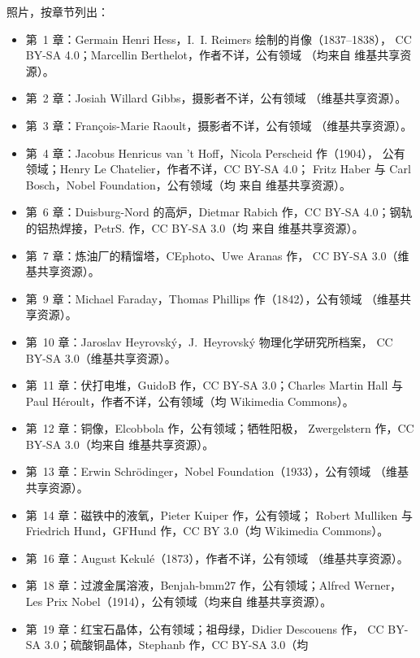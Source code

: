 \bigskip
\noindent 照片，按章节列出：
\begin{itemize}\small
  \item 第~1 章：Germain Henri Hess，I.~I. Reimers 绘制的肖像（1837--1838），
        CC BY-SA 4.0；Marcellin Berthelot，作者不详，公有领域
        （均来自 维基共享资源）。
  \item 第~2 章：Josiah Willard Gibbs，摄影者不详，公有领域
        （维基共享资源）。
  \item 第~3 章：François-Marie Raoult，摄影者不详，公有领域
        （维基共享资源）。
  \item 第~4 章：Jacobus Henricus van 't Hoff，Nicola Perscheid 作（1904），
        公有领域；Henry Le Chatelier，作者不详，CC BY-SA 4.0；
        Fritz Haber 与 Carl Bosch，Nobel Foundation，公有领域（均
        来自 维基共享资源）。
  \item 第~6 章：Duisburg-Nord 的高炉，Dietmar Rabich 作，CC BY-SA
        4.0；钢轨的铝热焊接，PetrS. 作，CC BY-SA 3.0（均
        来自 维基共享资源）。
  \item 第~7 章：炼油厂的精馏塔，CEphoto、Uwe Aranas 作，
        CC BY-SA 3.0（维基共享资源）。
  \item 第~9 章：Michael Faraday，Thomas Phillips 作（1842），公有领域
        （维基共享资源）。
  \item 第~10 章：Jaroslav Heyrovsk\'y，J.~Heyrovsk\'y 物理化学研究所档案，
        CC BY-SA 3.0（维基共享资源）。
  \item 第~11 章：伏打电堆，GuidoB 作，CC BY-SA 3.0；Charles Martin Hall
        与 Paul H\'eroult，作者不详，公有领域（均 Wikimedia
        Commons）。
  \item 第~12 章：铜像，Elcobbola 作，公有领域；牺牲阳极，
        Zwergelstern 作，CC BY-SA 3.0（均来自 维基共享资源）。
  \item 第~13 章：Erwin Schr\"odinger，Nobel Foundation（1933），公有领域
        （维基共享资源）。
  \item 第~14 章：磁铁中的液氧，Pieter Kuiper 作，公有领域；
        Robert Mulliken 与 Friedrich Hund，GFHund 作，CC BY 3.0（均 Wikimedia
        Commons）。
  \item 第~16 章：August Kekul\'e（1873），作者不详，公有领域
        （维基共享资源）。
  \item 第~18 章：过渡金属溶液，Benjah-bmm27 作，公有领域；Alfred
        Werner，Les Prix Nobel（1914），公有领域（均来自 维基共享资源）。
  \item 第~19 章：红宝石晶体，公有领域；祖母绿，Didier Descouens 作，
        CC BY-SA 3.0；硫酸铜晶体，Stephanb 作，CC BY-SA 3.0（均

\end{itemize}

